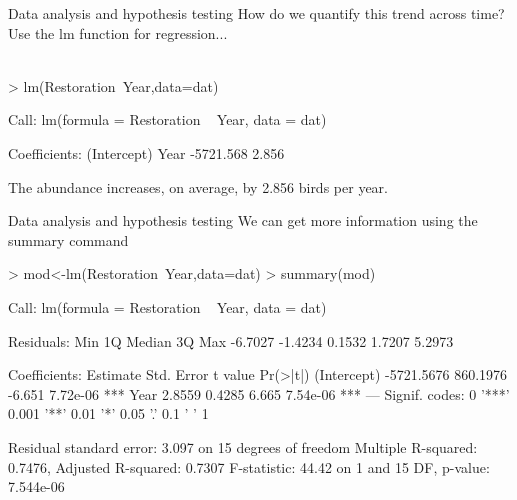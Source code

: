 \documentclass[xcolor=svgnames]{beamer}
\begin{document}
\begin{frame}[fragile]{Data analysis and hypothesis testing}
How do we quantify this trend across time? Use the lm function for regression...\\~\\
\begin{Schunk}
\begin{Sinput}
> lm(Restoration~Year,data=dat)
\end{Sinput}
\end{Schunk}
\begin{Schunk}
\begin{Soutput}
Call:
lm(formula = Restoration ~ Year, data = dat)

Coefficients:
(Intercept)         Year  
  -5721.568        2.856  
\end{Soutput}
\end{Schunk}
\vspace{0.2in}
The abundance increases, on average, by 2.856 birds per year.
\end{frame}

\begin{frame}[fragile]{Data analysis and hypothesis testing}
We can get more information using the summary command 
\vspace{0.1in}
\begin{Schunk}
\begin{Sinput}
> mod<-lm(Restoration~Year,data=dat)
> summary(mod)
\end{Sinput}
\end{Schunk}
\scriptsize
\begin{Schunk}
\begin{Soutput}
Call:
lm(formula = Restoration ~ Year, data = dat)

Residuals:
    Min      1Q  Median      3Q     Max 
-6.7027 -1.4234  0.1532  1.7207  5.2973 

Coefficients:
              Estimate Std. Error t value Pr(>|t|)    
(Intercept) -5721.5676   860.1976  -6.651 7.72e-06 ***
Year            2.8559     0.4285   6.665 7.54e-06 ***
---
Signif. codes:  0 '***' 0.001 '**' 0.01 '*' 0.05 '.' 0.1 ' ' 1

Residual standard error: 3.097 on 15 degrees of freedom
Multiple R-squared:  0.7476,	Adjusted R-squared:  0.7307 
F-statistic: 44.42 on 1 and 15 DF,  p-value: 7.544e-06
\end{Soutput}
\end{Schunk}
\end{frame}
\end{document}
